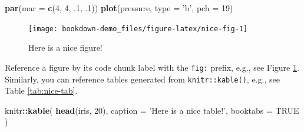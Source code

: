 \documentclass[]{book}
\newenvironment{Shaded}{\begin{snugshade}}{\end{snugshade}}
\newcommand{\KeywordTok}[1]{\textcolor[rgb]{0.13,0.29,0.53}{\textbf{#1}}}
\newcommand{\DataTypeTok}[1]{\textcolor[rgb]{0.13,0.29,0.53}{#1}}
\newcommand{\DecValTok}[1]{\textcolor[rgb]{0.00,0.00,0.81}{#1}}
\newcommand{\StringTok}[1]{\textcolor[rgb]{0.31,0.60,0.02}{#1}}
\newcommand{\OtherTok}[1]{\textcolor[rgb]{0.56,0.35,0.01}{#1}}
\newcommand{\OperatorTok}[1]{\textcolor[rgb]{0.81,0.36,0.00}{\textbf{#1}}}
\newcommand{\NormalTok}[1]{#1}
\begin{document}
\begin{Shaded}
\begin{Highlighting}[]
\KeywordTok{par}\NormalTok{(}\DataTypeTok{mar =} \KeywordTok{c}\NormalTok{(}\DecValTok{4}\NormalTok{, }\DecValTok{4}\NormalTok{, .}\DecValTok{1}\NormalTok{, .}\DecValTok{1}\NormalTok{))}
\KeywordTok{plot}\NormalTok{(pressure, }\DataTypeTok{type =} \StringTok{'b'}\NormalTok{, }\DataTypeTok{pch =} \DecValTok{19}\NormalTok{)}
\end{Highlighting}
\end{Shaded}

\begin{figure}

{\centering \texttt{[image: bookdown-demo\_files/figure-latex/nice-fig-1]} 

}

\caption{Here is a nice figure!}\label{fig:nice-fig}
\end{figure}

Reference a figure by its code chunk label with the \texttt{fig:}
prefix, e.g., see Figure \ref{fig:nice-fig}. Similarly, you can
reference tables generated from \texttt{knitr::kable()}, e.g., see Table
\ref{tab:nice-tab}.

\begin{Shaded}
\begin{Highlighting}[]
\NormalTok{knitr}\OperatorTok{::}\KeywordTok{kable}\NormalTok{(}
  \KeywordTok{head}\NormalTok{(iris, }\DecValTok{20}\NormalTok{), }\DataTypeTok{caption =} \StringTok{'Here is a nice table!'}\NormalTok{,}
  \DataTypeTok{booktabs =} \OtherTok{TRUE}
\NormalTok{)}
\end{Highlighting}
\end{Shaded}
\end{document}
